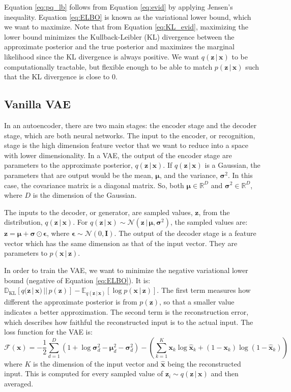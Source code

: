 \documentclass{article}
\newcommand{\R}{\mathbb{R}}
\newcommand{\E}{\mathbb{E}}
\newcommand{\bz}{\mathbf{z}}
\newcommand{\bx}{\mathbf{x}}
\newcommand{\given}{\,|\,}
\newcommand{\KL}{\mathbb{D}_{\text{KL}}}
\newcommand{\N}{\mathcal{N}}
\newcommand{\bsig}{\boldsymbol{\sigma}}
\newcommand{\bmu}{\boldsymbol{\mu}}
\begin{document}
Equation \ref{eq:pq_lb} follows from Equation \ref{eq:evid} by applying Jensen's inequality.  Equation 
\ref{eq:ELBO} is known as the variational lower bound, which we want to maximize.  Note that from
Equation \ref{eq:KL_evid}, maximizing the lower bound minimizes the Kullback-Leibler (KL) divergence 
between the approximate posterior and the true posterior and maximizes the marginal likelihood since
the KL divergence is always positive.  We want $q(\bz \given \bx)$ to be computationally tractable, but
flexible enough to be able to match $p(\bz \given \bx)$ such that the KL divergence is close to 0.

\subsection{Vanilla VAE}

In an autoencoder, there are two main stages: the encoder stage and the decoder stage, which are
both neural networks.  The input to the encoder, or recognition, stage is the high dimension feature 
vector that we want to reduce into a space with lower dimensionality.  In a VAE, the output of the 
encoder stage are parameters to the approximate posterior, $q(\bz \given \bx)$.  If $q(\bz \given \bx)$
is a Gaussian, the parameters that are output would be the mean, $\bmu$, and the variance, 
$\bsig^2$.  In this case, the covariance matrix is a diagonal matrix. So, both $\bmu\in\R^D$
and $\bsig^2\in\R^D$, where $D$ is the dimension of the Gaussian.

The inputs to the decoder, or generator, are sampled values, $\bz$, from the distribution, $q(\bz \given \bx)$.  
For $q(\bz \given \bx) \sim \N(\bz \given \bmu, \bsig^2)$, the sampled values are: $\bz = \bmu + \bsig\odot
\boldsymbol{\epsilon}$, where $\boldsymbol{\epsilon} \sim \N(0, \mathbf{I})$.  The output of the decoder 
stage is a feature vector which has the same dimension as that of the input vector.  They are parameters 
to $p(\bx \given \bz)$.

In order to train the VAE, we want to minimize the negative variational lower bound (negative of Equation 
\ref{eq:ELBO}).  It is: $\KL\left[q(\bz \given \bx) \,||\, p(\bz)\right] - \E_{q(\bz \given \bx)}\left[\log p(\bx \given \bz)\right]$.
The first term measures how different the approximate posterior is from $p(\bz)$, so that a smaller value
indicates a better approximation.  The second term is the reconstruction error, which describes how faithful
the reconstructed input is to the actual input.  The loss function for the VAE is:
\begin{equation} \label{eq:ELBO_VAE}
	\mathcal{F}(\bx) = -\frac{1}{2}\sum_{d=1}^D \left(1 + \log\bsig_d^2 - \bmu_d^2 - \bsig_d^2\right)
					- \left(\sum_{k=1}^K \bx_k \log \hat{\bx}_k + 
								\left(1 - \bx_k\right)\log\left(1 - \hat{\bx}_k\right)\right)
\end{equation}
where $K$ is the dimension of the input vector and $\hat{\bx}$ being the reconstructed input.  This is
computed for every sampled value of $\bz_i \sim q(\bz \given \bx)$ and then averaged.
\end{document}
